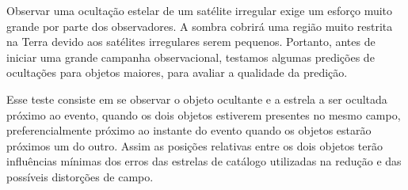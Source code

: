 \documentclass[12pt,a4paper]{report}
\begin{document}




Observar uma ocultação estelar de um satélite irregular exige um esforço muito grande por parte dos observadores. A sombra cobrirá uma região muito restrita na Terra devido aos satélites irregulares serem pequenos. Portanto, antes de iniciar uma grande campanha observacional, testamos algumas predições de ocultações para objetos maiores, para avaliar a qualidade da predição.

Esse teste consiste em se observar o objeto ocultante e a estrela a ser ocultada próximo ao evento, quando os dois objetos estiverem presentes no mesmo campo, preferencialmente próximo ao instante do evento quando os objetos estarão próximos um do outro. Assim as posições relativas entre os dois objetos terão influências mínimas dos erros das estrelas de catálogo utilizadas na redução e das possíveis distorções de campo.
\end{document}
